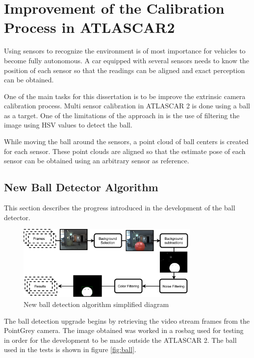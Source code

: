 \chapter{Improvement of the Calibration Process in ATLASCAR2}

Using sensors to recognize the environment is of most importance for vehicles to become fully autonomous. A car equipped with several sensors needs to know the position of each sensor so that the readings can be aligned and exact perception can be obtained. 

One of the main tasks for this dissertation is to be improve the extrinsic camera calibration process. Multi sensor calibration in ATLASCAR 2 is done using a ball as a target. One of the limitations of the approach in \cite{VieiradaSilva2016} is the use of filtering the image using HSV values to detect the ball.

While moving the ball around the sensors, a point cloud of ball centers is created for each sensor. These point clouds are aligned so that the estimate pose of each sensor can be obtained using an arbitrary sensor as reference.

\section{New Ball Detector Algorithm}

This section describes the progress introduced in the development of the ball detector.

\begin{figure}[htp]
	
	\centering
	\includegraphics[width=0.8\textwidth]{capcalib/imgs/calib_implementation.pdf}
	
	\caption{New ball detection algorithm simplified diagram}
	\label{fig:ball_diagram}
	
\end{figure}

The ball detection upgrade begins by retrieving the video stream frames from the PointGrey camera. The image obtained was worked in a rosbag used for testing in order for the development to be made outside the ATLASCAR 2. The ball used in the tests is shown in figure \ref{fig:ball}. 


